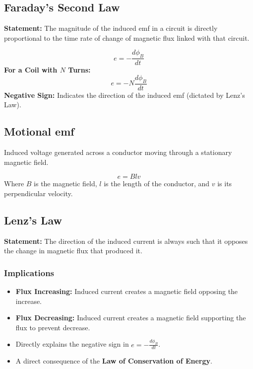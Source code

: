 \documentclass[11pt,a4paper]{article}
\begin{document}
\subsection{Faraday's Second Law}
\begin{pyqbox}
    \textbf{Statement:} The magnitude of the induced emf in a circuit is directly proportional to the time rate of change of magnetic flux linked with that circuit.
\end{pyqbox}

\begin{formulabox}
    \[ e = -\frac{d\phi_B}{dt} \]
    \textbf{For a Coil with $N$ Turns:}
    \[ e = -N\frac{d\phi_B}{dt} \]
    \textbf{Negative Sign:} Indicates the direction of the induced emf (dictated by Lenz's Law).
\end{formulabox}

\subsection{Motional emf}
Induced voltage generated across a conductor moving through a stationary magnetic field.
\begin{formulabox}
    \[ e = Blv \]
    Where $B$ is the magnetic field, $l$ is the length of the conductor, and $v$ is its perpendicular velocity.
\end{formulabox}

\subsection{Lenz's Law}
\begin{pyqbox}
    \textbf{Statement:} The direction of the induced current is always such that it opposes the change in magnetic flux that produced it.
\end{pyqbox}

\subsubsection{Implications}
\begin{itemize}
    \item \textbf{Flux Increasing:} Induced current creates a magnetic field opposing the increase.
    \item \textbf{Flux Decreasing:} Induced current creates a magnetic field supporting the flux to prevent decrease.
    \item Directly explains the negative sign in $e = -\frac{d\phi_B}{dt}$.
    \item A direct consequence of the \textbf{Law of Conservation of Energy}.
\end{itemize}
\end{document}
